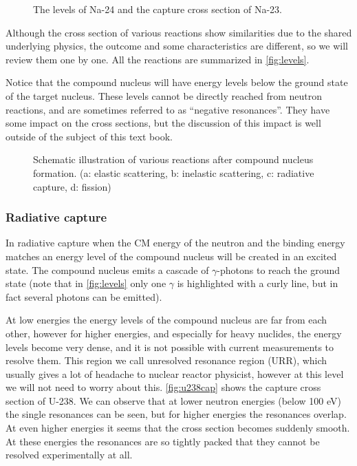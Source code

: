 \begin{figure}[ht!]
\protect {}\protect
\caption{\label{fig:nalevels} \footnotesize{The levels of Na-24 and the capture cross section of Na-23.}}
\end{figure}

Although the cross section of various reactions show similarities due to the shared underlying physics, the outcome and some characteristics are different, so we will review them one by one. All the reactions are summarized in \autoref{fig:levels}.

Notice that the compound nucleus will have energy levels below the ground state of the target nucleus. These levels cannot be directly reached from neutron reactions, and are sometimes referred to as ``negative resonances''. They have some impact on the cross sections, but the discussion of this impact is well outside of the subject of this text book.

\begin{figure}[ht!]
\protect {}\protect
\caption{\label{fig:levels} \footnotesize{Schematic illustration of various reactions after compound nucleus formation. (a: elastic scattering, b: inelastic scattering, c: radiative capture, d: fission)}}
\end{figure}


\subsubsection*{Radiative capture}

In radiative capture when the CM energy of the neutron and the binding energy matches an energy level of the compound nucleus will be created in an excited state. The compound nucleus emits a cascade of $\gamma$-photons to reach the ground state (note that in \autoref{fig:levels} only one $\gamma$ is highlighted with a curly line, but in fact several photons can be emitted).

At low energies the energy levels of the compound nucleus are far from each other, however for higher energies, and especially for heavy nuclides, the energy levels become very dense, and it is not possible with current measurements to resolve them. This region we call unresolved resonance region (URR), which usually gives a lot of headache to nuclear reactor physicist, however at this level we will not need to worry about this. \autoref{fig:u238cap} shows the capture cross section of U-238. We can observe that at lower neutron energies (below 100 eV) the single resonances can be seen, but for higher energies the resonances overlap. At even higher energies it seems that the cross section becomes suddenly smooth. At these energies the resonances are so tightly packed that they cannot be resolved experimentally at all.


